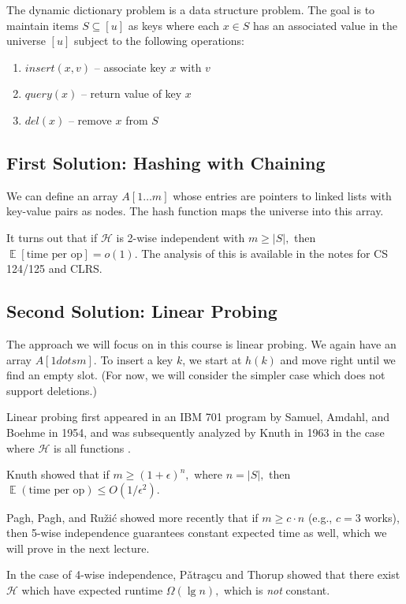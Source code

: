 \documentclass[11pt]{article}
\DeclareMathOperator*{\E}{\mathbb{E}}
\begin{document}
The dynamic dictionary problem is a data structure problem. The goal is to maintain items $S \subseteq [u]$ as keys where each $x \in S$ has an associated value in the universe $[u]$ subject to the following operations:

\begin{enumerate}
\item $insert(x, v)$ -- associate key $x$ with $v$
\item $query(x)$ -- return value of key $x$
\item $del(x)$ -- remove $x$ from $S$
\end{enumerate}

\subsection{First Solution: Hashing with Chaining}

We can define an array $A[1 \dots m]$ whose entries are pointers to linked lists with key-value pairs as nodes. The hash function maps the universe into this array.

It turns out that if $\mathcal{H}$ is 2-wise independent with $m \geq |S|,$ then $\E[\text{time per op}] = o(1).$ The analysis of this is available in the notes for CS 124/125 and CLRS.

\subsection{Second Solution: Linear Probing}

The approach we will focus on in this course is linear probing. We again have an array $A[1 dots m].$ To insert a key $k$, we start at $h(k)$ and move right until we find an empty slot. (For now, we will consider the simpler case which does not support deletions.)

Linear probing first appeared in an IBM 701 program by Samuel, Amdahl, and Boehme in 1954, and was subsequently analyzed by Knuth in 1963 in the case where $\mathcal{H}$ is all functions \cite{Knuth63}.

Knuth showed that if $m \geq (1 + \epsilon)^n,$ where $n = |S|,$ then $\E(\text{time per op}) \leq O(1/\epsilon^2).$

Pagh, Pagh, and Ru\v zi\'c showed more recently that if $m \geq c \cdot n$ (e.g., $c = 3$ works), then 5-wise independence guarantees constant expected time as well, which we will prove in the next lecture.

In the case of 4-wise independence, P\v atra\c scu and Thorup showed that there exist $\mathcal{H}$ which have expected runtime $\Omega(\lg n),$ which is \emph{not} constant.
\end{document}

